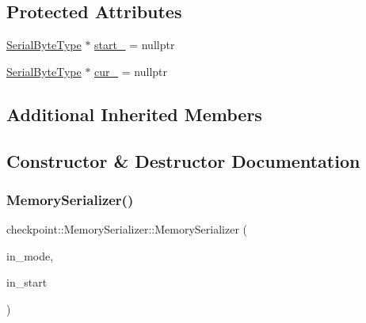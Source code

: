 \subsection*{Protected Attributes}
\begin{DoxyCompactItemize}
\item 
\hyperlink{namespacecheckpoint_ae57f01cdc0b81776c23b6c7c934c58f5}{Serial\+Byte\+Type} $\ast$ \hyperlink{structcheckpoint_1_1_memory_serializer_a6285e7e9821a996f6da9f2e6e59b00c2}{start\+\_\+} = nullptr
\item 
\hyperlink{namespacecheckpoint_ae57f01cdc0b81776c23b6c7c934c58f5}{Serial\+Byte\+Type} $\ast$ \hyperlink{structcheckpoint_1_1_memory_serializer_ab1f121effff21997447187346bbd8237}{cur\+\_\+} = nullptr
\end{DoxyCompactItemize}
\subsection*{Additional Inherited Members}


\subsection{Constructor \& Destructor Documentation}
\mbox{\label{structcheckpoint_1_1_memory_serializer_a9c748be7a41c032f2a33fbdc0dbd3611}} 
\subsubsection{\texorpdfstring{Memory\+Serializer()}{MemorySerializer()}\hspace{0.1cm}{\footnotesize\ttfamily [1/2]}}
{\footnotesize\ttfamily checkpoint\+::\+Memory\+Serializer\+::\+Memory\+Serializer (\begin{DoxyParamCaption}\item[{\hyperlink{namespacecheckpoint_ae2509499ccd8b1dc48fb535bf8aa3059}{Mode\+Type} const \&}]{in\+\_\+mode,  }\item[{\hyperlink{namespacecheckpoint_ae57f01cdc0b81776c23b6c7c934c58f5}{Serial\+Byte\+Type} $\ast$}]{in\+\_\+start }\end{DoxyParamCaption})\hspace{0.3cm}{\ttfamily [inline]}}

